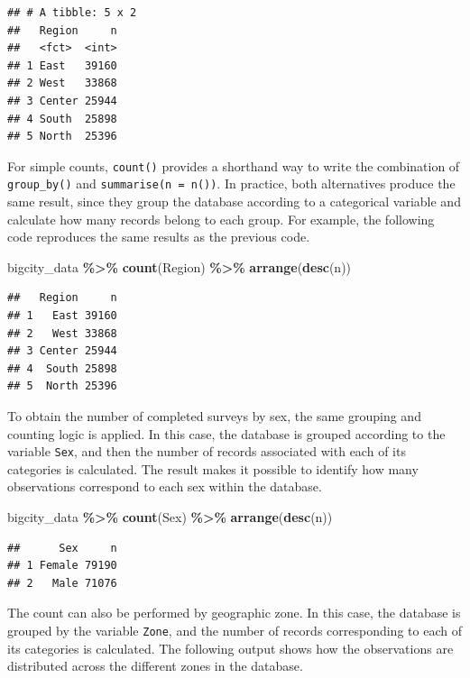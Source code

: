 \documentclass[
  english,
  12pt,
]{book}
\newenvironment{Shaded}{\begin{snugshade}}{\end{snugshade}}
\newcommand{\FunctionTok}[1]{\textcolor[rgb]{0.13,0.29,0.53}{\textbf{#1}}}
\newcommand{\NormalTok}[1]{#1}
\newcommand{\SpecialCharTok}[1]{\textcolor[rgb]{0.81,0.36,0.00}{\textbf{#1}}}
\begin{document}
\begin{verbatim}
## # A tibble: 5 x 2
##   Region     n
##   <fct>  <int>
## 1 East   39160
## 2 West   33868
## 3 Center 25944
## 4 South  25898
## 5 North  25396
\end{verbatim}

For simple counts, \texttt{count()} provides a shorthand way to write the combination of \texttt{group\_by()} and \texttt{summarise(n\ =\ n())}. In practice, both alternatives produce the same result, since they group the database according to a categorical variable and calculate how many records belong to each group. For example, the following code reproduces the same results as the previous code.

\begin{Shaded}
\begin{Highlighting}[]
\NormalTok{bigcity\_data }\SpecialCharTok{\%\textgreater{}\%}
  \FunctionTok{count}\NormalTok{(Region) }\SpecialCharTok{\%\textgreater{}\%}
  \FunctionTok{arrange}\NormalTok{(}\FunctionTok{desc}\NormalTok{(n))}
\end{Highlighting}
\end{Shaded}

\begin{verbatim}
##   Region     n
## 1   East 39160
## 2   West 33868
## 3 Center 25944
## 4  South 25898
## 5  North 25396
\end{verbatim}

To obtain the number of completed surveys by sex, the same grouping and counting logic is applied. In this case, the database is grouped according to the variable \texttt{Sex}, and then the number of records associated with each of its categories is calculated. The result makes it possible to identify how many observations correspond to each sex within the database.

\begin{Shaded}
\begin{Highlighting}[]
\NormalTok{bigcity\_data }\SpecialCharTok{\%\textgreater{}\%}
  \FunctionTok{count}\NormalTok{(Sex) }\SpecialCharTok{\%\textgreater{}\%}
  \FunctionTok{arrange}\NormalTok{(}\FunctionTok{desc}\NormalTok{(n))}
\end{Highlighting}
\end{Shaded}

\begin{verbatim}
##      Sex     n
## 1 Female 79190
## 2   Male 71076
\end{verbatim}

The count can also be performed by geographic zone. In this case, the database is grouped by the variable \texttt{Zone}, and the number of records corresponding to each of its categories is calculated. The following output shows how the observations are distributed across the different zones in the database.
\end{document}
